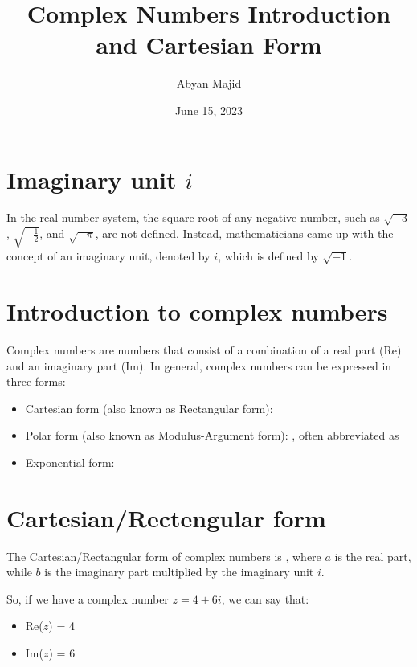 \documentclass{article}
\begin{document}
\title{Complex Numbers Introduction and Cartesian Form}
\author{Abyan Majid}
\date{June 15, 2023}
\maketitle

\section{Imaginary unit $i$}

In the real number system, the square root of any negative number, such as $\sqrt{-3}$, $\sqrt{{-\frac{1}{2}}}$, and $\sqrt{-\pi}$, are not defined. Instead, mathematicians came up with the concept of an imaginary unit, denoted by $i$, which is defined by $\sqrt{-1}$.
\begin{center}
\end{center}

\section{Introduction to complex numbers}
Complex numbers are numbers that consist of a combination of a real part (Re) and an imaginary part (Im). In general, complex numbers can be expressed in three forms:
\begin{itemize}
    \item Cartesian form (also known as Rectangular form): 
    \item Polar form (also known as Modulus-Argument form): , often abbreviated as 
    \item Exponential form: 
\end{itemize}

\section{Cartesian/Rectengular form}
The Cartesian/Rectangular form of complex numbers is , where $a$ is the real part, while $b$ is the imaginary part multiplied by the imaginary unit $i$.

\vspace{\baselineskip}

\noindent So, if we have a complex number $z=4+6i$, we can say that:
\begin{itemize}
    \item Re($z$) = 4
    \item Im($z$) = 6
\end{itemize}
\end{document}
